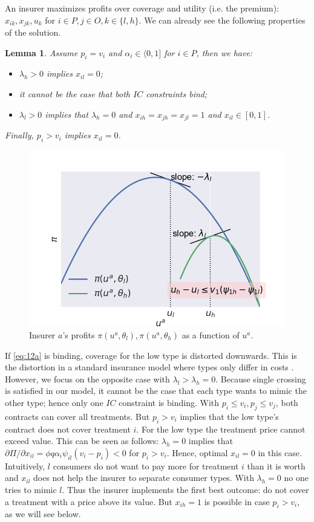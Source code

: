 \documentclass[12pt,english,a4paper]{article}
\newtheorem{lemma}{Lemma}
\begin{document}
An insurer maximizes profits over coverage and utility (i.e. the premium): \(x_{ik},x_{jk},u_k\) for \(i \in P, j \in O, k \in \{l,h\}\). We can already see the following properties of the solution.
\begin{lemma}
\label{Baseline_results}
Assume \(p_i = v_i\) and \(\alpha_i \in \langle 0,1]\) for \(i \in P\), then we have:
\begin{itemize}
\item \(\lambda_h>0\) implies \(x_{il}=0\);
\item it cannot be the case that both \(IC\) constraints bind;
\item \(\lambda_{l}>0\) implies that \(\lambda_h=0\) and \(x_{ih}=x_{jh}=x_{jl}=1\) and \(x_{il} \in [0,1]\).
\end{itemize}
Finally, \(p_i >v_i\) implies \(x_{il} =0\).
\end{lemma}

\begin{figure}[htbp]
\centering
\includegraphics[width=.9\linewidth]{profitfunctions.png}
\caption{\label{fig:org799c9ab}Insurer \(a\)'s profits \(\pi(u^a,\theta_l),\pi(u^a,\theta_h)\) as a function of \(u^a\).}
\end{figure}

If \eqref{eq:12a} is binding, coverage for the low type is distorted downwards. This is the distortion in a standard insurance model where types only differ in costs \citep{rot76}. However, we focus on the opposite case with \(\lambda_l > \lambda_h = 0\). Because single crossing is satisfied in our model, it cannot be the case that each type wants to mimic the other type; hence only one \(IC\) constraint is binding. With \(p_i \leq v_i, p_j \leq v_j\), both contracts can cover all treatments. But \(p_i > v_i\) implies that the low type's contract does not cover treatment \(i\). For the low type the treatment price cannot exceed value. This can be seen as follows: \(\lambda_h =0\) implies that \(\partial \Pi/\partial x_{il}=\phi q \alpha_i \psi_{il} (v_i-p_i) < 0\) for \(p_i > v_i\). Hence, optimal \(x_{il}=0\) in this case. Intuitively, \(l\) consumers do not want to pay more for treatment \(i\) than it is worth and \(x_{il}\) does not help the insurer to separate consumer types. With \(\lambda_h = 0\) no one tries to mimic \(l\). Thus the insurer implements the first best outcome: do not cover a treatment with a price above its value. But \(x_{ih}=1\) is possible in case \(p_i > v_i\), as we will see below.
\end{document}
